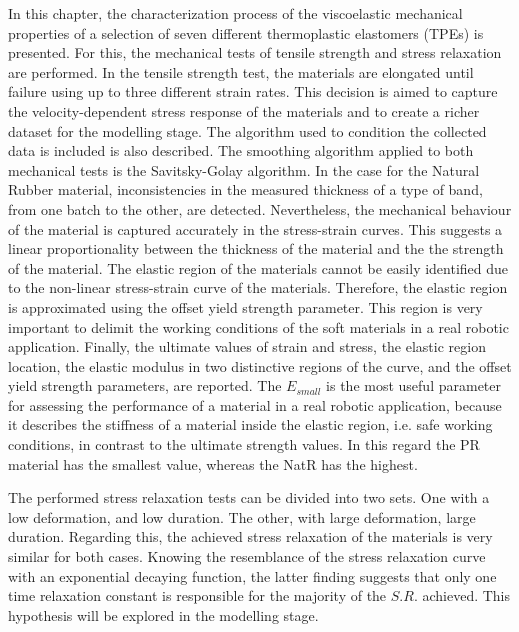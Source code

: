 In this chapter, the characterization process of the viscoelastic mechanical properties of a selection of seven different thermoplastic elastomers (TPEs) is presented. For this, the mechanical tests of tensile strength and stress relaxation are performed. In the tensile strength test, the materials are elongated until failure using up to three different strain rates. This decision is aimed to capture the velocity-dependent stress response of the materials and to create a richer dataset for the modelling stage. The algorithm used to condition the collected data is included is also described. The smoothing algorithm applied to both mechanical tests is the Savitsky-Golay algorithm. In the case for the Natural Rubber material, inconsistencies in the measured thickness of a type of band, from one batch to the other, are detected. Nevertheless, the mechanical behaviour of the material is captured accurately in the stress-strain curves. This suggests a linear proportionality between the thickness of the material and the the strength of the material. The elastic region of the materials cannot be easily identified due to the non-linear stress-strain curve of the materials. Therefore, the elastic region is approximated using the offset yield strength parameter. This region is very important to delimit the working conditions of the soft materials in a real robotic application. Finally, the ultimate values of strain and stress, the elastic region location, the elastic modulus in two distinctive regions of the curve, and the offset yield strength parameters, are reported. The $E_{small}$ is the most useful parameter for assessing the performance of a material in a real robotic application, because it describes the stiffness of a material inside the elastic region, i.e. safe working conditions, in contrast to the ultimate strength values. In this regard the PR material has the smallest value, whereas the NatR has the highest.

The performed stress relaxation tests can be divided into two sets. One with a low deformation, and low duration. The other, with large deformation, large duration. Regarding this, the achieved stress relaxation of the materials is very similar for both cases. Knowing the resemblance of the stress relaxation curve with an exponential decaying function, the latter finding suggests that only one time relaxation constant is responsible for the majority of the $S.R.$ achieved. This hypothesis will be explored in the modelling stage.